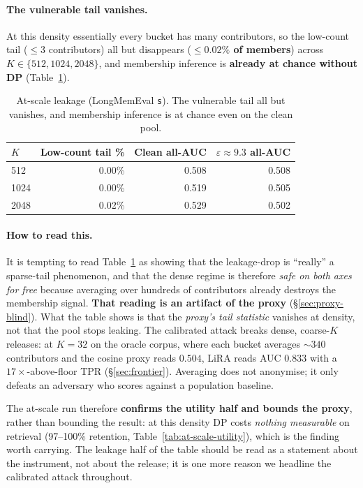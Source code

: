 \documentclass[pdflatex,sn-mathphys-num,12pt]{sn-jnl}
\theoremstyle{thmstyleone}%
\theoremstyle{thmstyletwo}%
\theoremstyle{thmstylethree}%
\newcommand{\eps}{\varepsilon}
\newcommand{\secref}[1]{\S\ref{#1}}
\begin{document}
\paragraph{The vulnerable tail vanishes.} At this density essentially every bucket has many
contributors, so the low-count tail ($\leq 3$ contributors) all but disappears
(\textbf{${\leq}0.02\%$ of members}) across $K \in \{512, 1024, 2048\}$, and membership
inference is \textbf{already at chance without DP} (Table~\ref{tab:at-scale-leakage}).

\begin{table}[t]
  \centering
  \caption{At-scale leakage (LongMemEval \texttt{s}). The vulnerable tail all but vanishes, and
  membership inference is at chance even on the clean pool.}
  \label{tab:at-scale-leakage}
  \begin{tabular}{@{}lrrr@{}}
    \toprule
    $K$ & Low-count tail \% & Clean all-AUC & $\eps \approx 9.3$ all-AUC \\
    \midrule
    512  & 0.00\% & 0.508 & 0.508 \\
    1024 & 0.00\% & 0.519 & 0.505 \\
    2048 & 0.02\% & 0.529 & 0.502 \\
    \bottomrule
  \end{tabular}
\end{table}

\paragraph{How to read this.} It is tempting to read Table~\ref{tab:at-scale-leakage} as showing
that the leakage-drop is ``really'' a sparse-tail phenomenon, and that the dense regime is
therefore \emph{safe on both axes for free} because averaging over hundreds of contributors
already destroys the membership signal. \textbf{That reading is an artifact of the proxy}
(\secref{sec:proxy-blind}). What the table shows is that the \emph{proxy's tail statistic}
vanishes at density, not that the pool stops leaking. The
calibrated attack breaks dense, coarse-$K$ releases: at $K = 32$ on the oracle corpus, where each
bucket averages ${\sim}340$ contributors and the cosine proxy reads $0.504$, LiRA reads AUC
$\mathbf{0.833}$ with a $17\times$-above-floor TPR (\secref{sec:frontier}). Averaging does not
anonymise; it only defeats an adversary who scores against a population baseline.

The at-scale run therefore \textbf{confirms the utility half and bounds the proxy}, rather than
bounding the result: at this density DP costs \emph{nothing measurable} on retrieval (97--100\%
retention, Table~\ref{tab:at-scale-utility}), which is the finding worth carrying. The leakage half
of the table should be read as a statement about the instrument, not about the release; it is
one more reason we headline the calibrated attack throughout.
\end{document}

